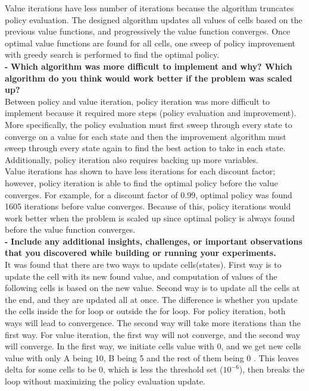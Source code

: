 \documentclass[11pt]{article}
\begin{document}
\noindent
Value iterations have less number of iterations because the algorithm truncates
policy evaluation. The designed algorithm updates all values of cells based on
the previous value functions, and progressively the value function converges.
Once optimal value functions are found for all cells, one sweep of policy
improvement with greedy search is performed to find the optimal policy. \\

\noindent
\textbf{-}
\noindent
\textbf{Which algorithm was more difficult to implement and why? Which algorithm
do you think would work better if the problem was scaled up?}
\\

\noindent
Between policy and value iteration, policy iteration was more difficult to
implement because it required more steps (policy evaluation and improvement).
More specifically, the policy evaluation must first sweep through every state
to converge on a value for each state and then the improvement algorithm must
sweep through every state again to find the best action to take in each state.
Additionally, policy iteration also requires backing up more variables.
\\

\noindent
Value iterations has shown to have less iterations for each discount factor;
however, policy iteration is able to find the optimal policy before the value
converges. For example, for a discount factor of 0.99, optimal policy was found
1605 iterations before value converges. Because of this, policy iterations would
work better when the problem is scaled up since optimal policy is always found
before the value function converges.\\

\noindent
\textbf{-}
\noindent
\textbf{Include any additional insights, challenges, or important observations
that you discovered while building or running your experiments.}
\\

\noindent
It was found that there are two ways to update cells(states). First way is to
update the cell with its new found value, and computation of values of the
following cells is based on the new value. Second way is to update all the cells
at the end, and they are updated all at once. The difference is whether you
update the cells inside the for loop or outside the for loop. For policy
iteration, both ways will lead to convergence. The second way will take more
iterations than the first way. For value iteration, the first way will not
converge, and the second way will converge.  In the first way, we initiate cells
value with 0, and we get new cells value with only A being 10, B being 5 and the
rest of them being 0 . This leaves delta for some cells to be 0, which is less
the threshold set ($10^{-6}$), then breaks the loop without maximizing the
policy evaluation update. \\
\end{document}
